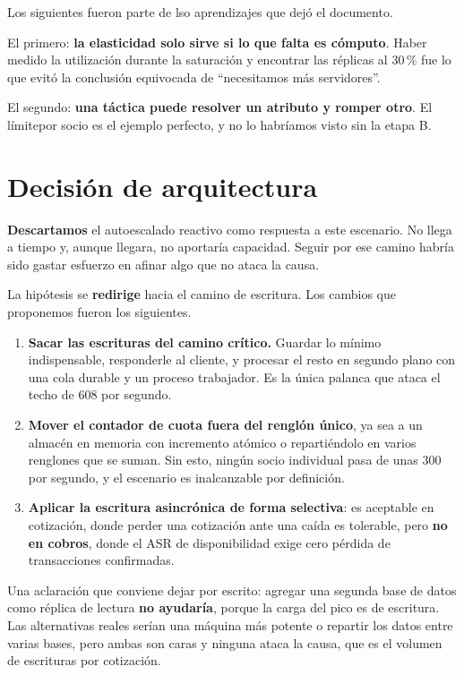 \documentclass[11pt]{article}
\begin{document}
Los siguientes fueron parte de lso aprendizajes que dejó el documento.

El primero: \textbf{la elasticidad solo sirve si lo que falta es cómputo}. Haber medido la
utilización durante la saturación  y encontrar las réplicas al 30\,\% fue lo que evitó la
conclusión equivocada de ``necesitamos más servidores''.

El segundo: \textbf{una táctica puede resolver un atributo y romper otro}. El límitepor socio es
el ejemplo perfecto, y no lo habríamos visto sin la etapa B.

\section{Decisión de arquitectura}

\textbf{Descartamos} el autoescalado reactivo como respuesta a este escenario. No llega a tiempo y,
aunque llegara, no aportaría capacidad. Seguir por ese camino habría sido gastar esfuerzo en afinar
algo que no ataca la causa.

La hipótesis se \textbf{redirige} hacia el camino de escritura. Los cambios que proponemos fueron los siguientes.

\begin{enumerate}
  \item \textbf{Sacar las escrituras del camino crítico.} Guardar lo mínimo indispensable,
        responderle al cliente, y procesar el resto en segundo plano con una cola durable y un
        proceso trabajador. Es la única palanca que ataca el techo de 608 por segundo.
  \item \textbf{Mover el contador de cuota fuera del renglón único}, ya sea a un almacén en memoria
        con incremento atómico o repartiéndolo en varios renglones que se suman. Sin esto, ningún
        socio individual pasa de unas 300 por segundo, y el escenario es inalcanzable por
        definición.
  \item \textbf{Aplicar la escritura asincrónica de forma selectiva}: es aceptable en cotización,
        donde perder una cotización ante una caída es tolerable, pero \textbf{no en cobros}, donde
        el ASR de disponibilidad exige cero pérdida de transacciones confirmadas.
\end{enumerate}

Una aclaración que conviene dejar por escrito: agregar una segunda base de datos como réplica de
lectura \textbf{no ayudaría}, porque la carga del pico es de escritura. Las alternativas reales
serían una máquina más potente o repartir los datos entre varias bases, pero ambas son caras y
ninguna ataca la causa, que es el volumen de escrituras por cotización.
\end{document}
